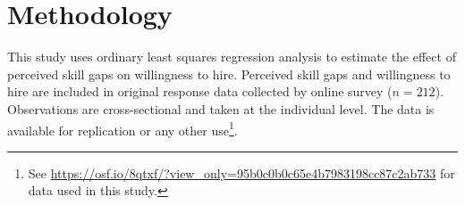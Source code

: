 \documentclass[review]{elsarticle}
\begin{document}



\section{Methodology}

This study uses ordinary least squares regression analysis to estimate the effect of perceived skill gaps on willingness to hire.
Perceived skill gaps and willingness to hire are included in original response data collected by online survey ($n = 212$).
Observations are cross-sectional and taken at the individual level.
The data is available for replication or any other use\footnote{
    See \url{https://osf.io/8qtxf/?view_only=95b0c0b0c65e4b7983198cc87c2ab733}
    for data used in this study.
}.
\end{document}
